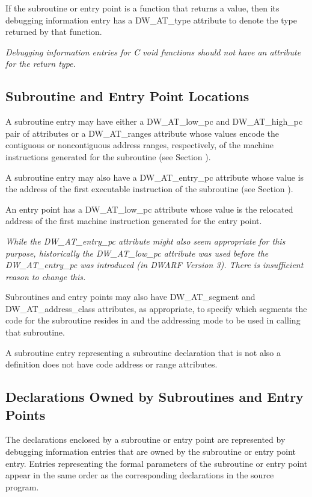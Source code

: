 If the subroutine or entry point is a function that returns a
value, then its debugging information entry has a DW\_AT\_type
attribute to denote the type returned by that function.

\textit{Debugging information entries for C void functions should
not have an attribute for the return type.  }


\subsection{Subroutine and Entry Point Locations}
\label{chap:subroutineandentrypointlocations}

A subroutine entry may have either a DW\_AT\_low\_pc and
DW\_AT\_high\_pc pair of attributes or a DW\_AT\_ranges attribute
whose values encode the contiguous or non\dash contiguous address
ranges, respectively, of the machine instructions generated
for the subroutine (see 
Section ).

A subroutine entry may also have a DW\_AT\_entry\_pc attribute
whose value is the address of the first executable instruction
of the subroutine (see 
Section ).

An entry point has a DW\_AT\_low\_pc attribute whose value is the
relocated address of the first machine instruction generated
for the entry point.

\textit{While the DW\_AT\_entry\_pc attribute might also seem appropriate
for this purpose, historically the DW\_AT\_low\_pc attribute
was used before the DW\_AT\_entry\_pc was introduced (in DWARF
Version 3). There is insufficient reason to change this.}

Subroutines and entry points may also have DW\_AT\_segment and
DW\_AT\_address\_class attributes, as appropriate, to specify
which segments the code for the subroutine resides in and
the addressing mode to be used in calling that subroutine.

A subroutine entry representing a subroutine declaration
that is not also a definition does not have code address or
range attributes.


\subsection{Declarations Owned by Subroutines and Entry Points} 
\label{chap:declarationsownedbysubroutinesandentrypoints}

The declarations enclosed by a subroutine or entry point are
represented by debugging information entries that are owned
by the subroutine or entry point entry. Entries representing
the formal parameters of the subroutine or entry point appear
in the same order as the corresponding declarations in the
source program.

